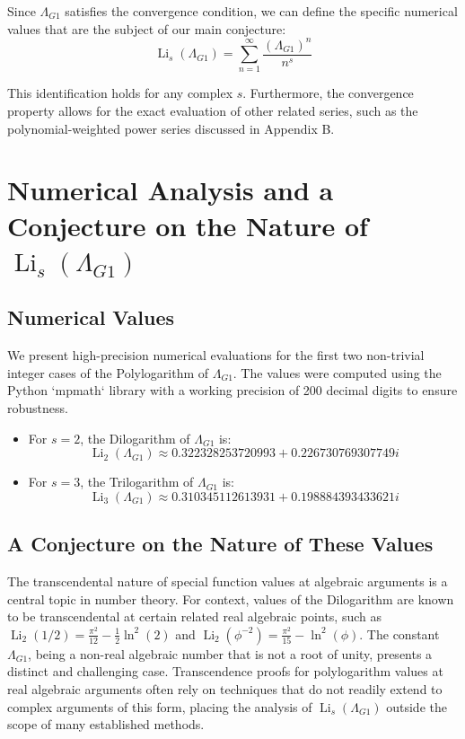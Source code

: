 \documentclass{amsart}
\theoremstyle{plain}
\theoremstyle{definition}
\theoremstyle{remark}
\DeclareMathOperator{\Li}{Li} %
\newcommand{\LambdaG}{\Lambda_{G1}}
\newcommand{\phiG}{\phi}
\begin{document}
Since $\LambdaG$ satisfies the convergence condition, we can define the specific numerical values that are the subject of our main conjecture:
$$ \Li_s(\LambdaG) = \sum_{n=1}^{\infty} \frac{(\LambdaG)^{n}}{n^s} $$

This identification holds for any complex $s$. Furthermore, the convergence property allows for the exact evaluation of other related series, such as the polynomial-weighted power series discussed in Appendix B.

\section{Numerical Analysis and a Conjecture on the Nature of \texorpdfstring{$\Li_s(\LambdaG)$}{Li\_s(Lambda\_G1)}}

\subsection{Numerical Values}
We present high-precision numerical evaluations for the first two non-trivial integer cases of the Polylogarithm of $\LambdaG$. The values were computed using the Python `mpmath` library with a working precision of 200 decimal digits to ensure robustness.
\begin{itemize}
    \item For $s=2$, the Dilogarithm of $\LambdaG$ is:
    $$ \Li_2(\LambdaG) \approx 0.322328253720993 + 0.226730769307749i $$
    
    \item For $s=3$, the Trilogarithm of $\LambdaG$ is:
    $$ \Li_3(\LambdaG) \approx 0.310345112613931 + 0.198884393433621i $$
    
\end{itemize}

\subsection{A Conjecture on the Nature of These Values}
The transcendental nature of special function values at algebraic arguments is a central topic in number theory. For context, values of the Dilogarithm are known to be transcendental at certain related real algebraic points, such as $\Li_2(1/2) = \frac{\pi^2}{12} - \frac{1}{2}\ln^2(2)$ and $\Li_2(\phiG^{-2}) = \frac{\pi^2}{15} - \ln^2(\phiG)$. The constant $\LambdaG$, being a non-real algebraic number that is not a root of unity, presents a distinct and challenging case. Transcendence proofs for polylogarithm values at real algebraic arguments often rely on techniques that do not readily extend to complex arguments of this form, placing the analysis of $\Li_s(\LambdaG)$ outside the scope of many established methods.
\end{document}
